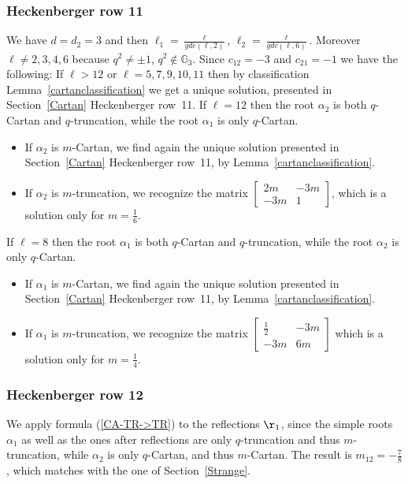 \documentclass[pdftex]{sigma}%
\numberwithin{equation}{section}
\begin{document}
\subsubsection*{Heckenberger row 11}
We have $d=d_2=3$ and then $\ell_1 = \frac{\ell}{gdc(\ell,2)}$, $\ell_2=\frac{\ell}{gdc(\ell,6)}$. Moreover $\ell \neq 2, 3, 4, 6$ because $q^2 \neq \pm 1$, $q^2 \not\in \mathbb{G}_3$. Since $c_{12}=-3$ and $c_{21}=-1$ we have the following:
If $\ell > 12$ or $\ell =5, 7, 9, 10, 11$ then by classification Lemma~\ref{cartanclassification} we get a unique solution, presented in Section~\ref{Cartan} Heckenberger row~11.
If $\ell = 12$ then the root $\alpha_2$ is both $q$-Cartan and $q$-truncation, while the root $\alpha_1$ is only $q$-Cartan.
\begin{itemize}\itemsep=0pt
	\item If $\alpha_2$ is $m$-Cartan, we find again the unique solution presented in Section~\ref{Cartan} Heckenberger row~11, by Lemma~\ref{cartanclassification}.
	\item If $\alpha_2$ is $m$-truncation, we recognize the matrix
	$\left[\begin{smallmatrix}
 2m & -3m\\
 -3m & 1
\end{smallmatrix}\right]$,
which is a solution only for $m=\frac{1}{6}$.
\end{itemize}
If $\ell = 8$ then the root $\alpha_1$ is both $q$-Cartan and $q$-truncation, while the root $\alpha_2$ is only $q$-Cartan.
\begin{itemize}\itemsep=0pt
	\item If $\alpha_1$ is $m$-Cartan, we find again the unique solution presented in Section~\ref{Cartan} Heckenberger row~11, by Lemma~\ref{cartanclassification}.
	\item If $\alpha_1$ is $m$-truncation, we recognize the matrix $\left[\begin{smallmatrix}
 \frac{1}{2} & -3m\\
 -3m & 6m
\end{smallmatrix}\right]$
which is a solution only for $m=\frac{1}{4}$.
\end{itemize}

\subsubsection*{Heckenberger row 12}
We apply formula (\ref{CA-TR->TR}) to the reflections $\r_1$, since the simple roots $\alpha_1$ as well as the ones after reflections are only $q$-truncation and thus $m$-truncation, while $\alpha_2$ is only $q$-Cartan, and thus $m$-Cartan. The result is $m_{12}=-\frac{7}{8}$, which matches with the one of Section~\ref{Strange}.
\end{document}
